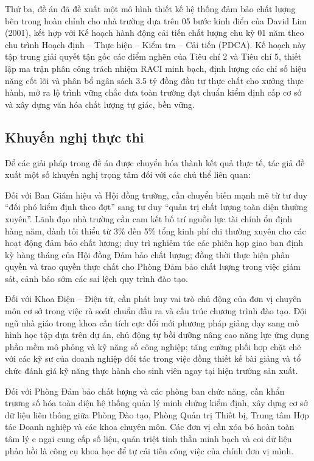 Thứ ba, đề án đã đề xuất một mô hình thiết kế hệ thống đảm bảo chất lượng bên trong hoàn chỉnh cho nhà trường dựa trên 05 bước kinh điển của David Lim (2001), kết hợp với Kế hoạch hành động cải tiến chất lượng chu kỳ 01 năm theo chu trình Hoạch định -- Thực hiện -- Kiểm tra -- Cải tiến (PDCA). Kế hoạch này tập trung giải quyết tận gốc các điểm nghẽn của Tiêu chí 2 và Tiêu chí 5, thiết lập ma trận phân công trách nhiệm RACI minh bạch, định lượng các chỉ số hiệu năng cốt lõi và phân bổ ngân sách 3.5 tỷ đồng đầu tư thực chất cho xưởng thực hành, mở ra lộ trình vững chắc đưa toàn trường đạt chuẩn kiểm định cấp cơ sở và xây dựng văn hóa chất lượng tự giác, bền vững.

\subsection{Khuyến nghị thực thi}

Để các giải pháp trong đề án được chuyển hóa thành kết quả thực tế, tác giả đề xuất một số khuyến nghị trọng tâm đối với các chủ thể liên quan:

Đối với Ban Giám hiệu và Hội đồng trường, cần chuyển biến mạnh mẽ từ tư duy ``đối phó kiểm định theo đợt'' sang tư duy ``quản trị chất lượng toàn diện thường xuyên''. Lãnh đạo nhà trường cần cam kết bố trí nguồn lực tài chính ổn định hàng năm, dành tối thiểu từ 3\% đến 5\% tổng kinh phí chi thường xuyên cho các hoạt động đảm bảo chất lượng; duy trì nghiêm túc các phiên họp giao ban định kỳ hàng tháng của Hội đồng Đảm bảo chất lượng; đồng thời thực hiện phân quyền và trao quyền thực chất cho Phòng Đảm bảo chất lượng trong việc giám sát, cảnh báo sớm các sai lệch quy trình đào tạo.

Đối với Khoa Điện -- Điện tử, cần phát huy vai trò chủ động của đơn vị chuyên môn cơ sở trong việc rà soát chuẩn đầu ra và cấu trúc chương trình đào tạo. Đội ngũ nhà giáo trong khoa cần tích cực đổi mới phương pháp giảng dạy sang mô hình học tập dựa trên dự án, chủ động tự bồi dưỡng nâng cao năng lực ứng dụng phần mềm mô phỏng và kỹ năng số công nghiệp; tăng cường phối hợp chặt chẽ với các kỹ sư của doanh nghiệp đối tác trong việc đồng thiết kế bài giảng và tổ chức đánh giá kỹ năng thực hành cho sinh viên ngay tại hiện trường sản xuất.

Đối với Phòng Đảm bảo chất lượng và các phòng ban chức năng, cần khẩn trương số hóa toàn diện hệ thống quản lý minh chứng kiểm định, xây dựng cơ sở dữ liệu liên thông giữa Phòng Đào tạo, Phòng Quản trị Thiết bị, Trung tâm Hợp tác Doanh nghiệp và các khoa chuyên môn. Các đơn vị cần xóa bỏ hoàn toàn tâm lý e ngại cung cấp số liệu, quán triệt tinh thần minh bạch và coi dữ liệu phản hồi là công cụ khoa học để tự cải tiến công việc của chính đơn vị mình.


